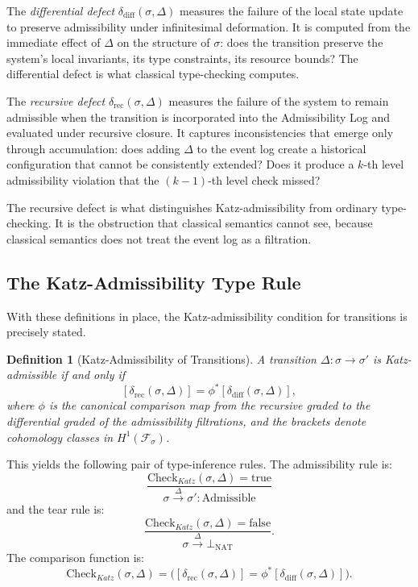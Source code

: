 \documentclass[12pt]{article}
\newtheorem{definition}{Definition}
\begin{document}
The \emph{differential defect} $\delta_{\mathrm{diff}}(\sigma,\Delta)$ measures the
failure of the local state update to preserve admissibility under infinitesimal
deformation. It is computed from the immediate effect of $\Delta$ on the structure of
$\sigma$: does the transition preserve the system's local invariants, its type
constraints, its resource bounds? The differential defect is what classical type-checking
computes.

The \emph{recursive defect} $\delta_{\mathrm{rec}}(\sigma,\Delta)$ measures the
failure of the system to remain admissible when the transition is incorporated into the
Admissibility Log and evaluated under recursive closure. It captures inconsistencies
that emerge only through accumulation: does adding $\Delta$ to the event log create a
historical configuration that cannot be consistently extended? Does it produce a $k$-th
level admissibility violation that the $(k-1)$-th level check missed?

The recursive defect is what distinguishes Katz-admissibility from ordinary
type-checking. It is the obstruction that classical semantics cannot see, because
classical semantics does not treat the event log as a filtration.

\subsection{The Katz-Admissibility Type Rule}

With these definitions in place, the Katz-admissibility condition for transitions is
precisely stated.

\begin{definition}[Katz-Admissibility of Transitions]
A transition $\Delta : \sigma \to \sigma'$ is \emph{Katz-admissible} if and only if
\[
[\delta_{\mathrm{rec}}(\sigma,\Delta)] = \phi^*[\delta_{\mathrm{diff}}(\sigma,\Delta)],
\]
where $\phi$ is the canonical comparison map from the recursive graded to the
differential graded of the admissibility filtrations, and the brackets denote
cohomology classes in $H^1(\mathcal{F}_\sigma)$.
\end{definition}

This yields the following pair of type-inference rules. The admissibility rule is:
\[
\frac{
\mathrm{Check}_{Katz}(\sigma,\Delta) = \mathrm{true}
}{
\sigma \xrightarrow{\Delta} \sigma' : \mathrm{Admissible}
}
\]
and the tear rule is:
\[
\frac{
\mathrm{Check}_{Katz}(\sigma,\Delta) = \mathrm{false}
}{
\sigma \xrightarrow{\Delta} \bot_{\mathrm{NAT}}
}.
\]
The comparison function is:
\[
\mathrm{Check}_{Katz}(\sigma,\Delta)
=
\Big([\delta_{\mathrm{rec}}(\sigma,\Delta)] = \phi^*[\delta_{\mathrm{diff}}(\sigma,\Delta)]\Big).
\]
\end{document}

